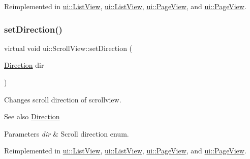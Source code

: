 Reimplemented in \hyperlink{classui_1_1ListView_aa4999666131727cdb1a32f13957914e3}{ui\+::\+List\+View}, \hyperlink{classui_1_1ListView_aaac3381602537a823529058b64bffabf}{ui\+::\+List\+View}, \hyperlink{classui_1_1PageView_a4ac6e8672026f60e326ffc054d167365}{ui\+::\+Page\+View}, and \hyperlink{classui_1_1PageView_a594124394d2bc1dff86069b87939b14c}{ui\+::\+Page\+View}.

\mbox{\label{classui_1_1ScrollView_a397502c59b9161726baa6c99c52e9233}} 
\subsubsection{\texorpdfstring{set\+Direction()}{setDirection()}\hspace{0.1cm}{\footnotesize\ttfamily [2/2]}}
{\footnotesize\ttfamily virtual void ui\+::\+Scroll\+View\+::set\+Direction (\begin{DoxyParamCaption}\item[{\hyperlink{classui_1_1ScrollView_aed2d778ae8098dcafe323b2beae8dd6b}{Direction}}]{dir }\end{DoxyParamCaption})\hspace{0.3cm}{\ttfamily [virtual]}}

Changes scroll direction of scrollview.

\begin{DoxySeeAlso}{See also}
{\ttfamily \hyperlink{classui_1_1ScrollView_aed2d778ae8098dcafe323b2beae8dd6b}{Direction}} 
\end{DoxySeeAlso}

\begin{DoxyParams}{Parameters}
{\em dir} & Scroll direction enum. \\
\hline
\end{DoxyParams}


Reimplemented in \hyperlink{classui_1_1ListView_aa4999666131727cdb1a32f13957914e3}{ui\+::\+List\+View}, \hyperlink{classui_1_1ListView_aaac3381602537a823529058b64bffabf}{ui\+::\+List\+View}, \hyperlink{classui_1_1PageView_a4ac6e8672026f60e326ffc054d167365}{ui\+::\+Page\+View}, and \hyperlink{classui_1_1PageView_a594124394d2bc1dff86069b87939b14c}{ui\+::\+Page\+View}.

\mbox{\label{classui_1_1ScrollView_aa8fc63dd4911dad972c05086145e8a68}} 
